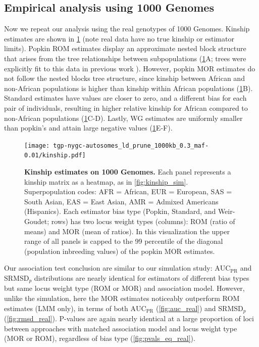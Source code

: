 \documentclass[11pt]{article}
\newcommand{\rmsd}{\text{SRMSD}_p}
\newcommand{\auc}{\text{AUC}_\text{PR}}
\begin{document}
\subsection{Empirical analysis using 1000 Genomes}

Now we repeat our analysis using the real genotypes of 1000 Genomes.
Kinship estimates are shown in \cref{fig:kinship_real} (note real data have no true kinship or estimator limits).
Popkin ROM estimates display an approximate nested block structure that arises from the tree relationships between subpopulations (\cref{fig:kinship_real}A; trees were explicitly fit to this data in previous work \citep{yao_limitations_2022}).
However, popkin MOR estimates do not follow the nested blocks tree structure, since kinship between African and non-African populations is higher than kinship within African populations (\cref{fig:kinship_real}B).
Standard estimates have values are closer to zero, and a different bias for each pair of individuals, resulting in higher relative kinship for African compared to non-African populations (\cref{fig:kinship_real}C-D).
Lastly, WG estimates are uniformly smaller than popkin's and attain large negative values (\cref{fig:kinship_real}E-F).

\begin{figure}[bp!]
  \centering
  \texttt{[image: tgp-nygc-autosomes\_ld\_prune\_1000kb\_0.3\_maf-0.01/kinship.pdf]}
  \caption{
    {\bf Kinship estimates on 1000 Genomes.}
    Each panel represents a kinship matrix as a heatmap, as in \cref{fig:kinship_sim}.
    Superpopulation codes: AFR = African, EUR = European, SAS = South Asian, EAS = East Asian, AMR = Admixed Americans (Hispanics).
    Each estimator bias type (Popkin, Standard, and Weir-Goudet; rows) has two locus weight types (columns): ROM (ratio of means) and MOR (mean of ratios).
    In this visualization the upper range of all panels is capped to the 99 percentile of the diagonal (population inbreeding values) of the popkin MOR estimates.
  }
  \label{fig:kinship_real}
\end{figure}

Our association test conclusion are similar to our simulation study: $\auc$ and $\rmsd$ distributions are nearly identical for estimators of different bias types but same locus weight type (ROM or MOR) and association model.
However, unlike the simulation, here the MOR estimates noticeably outperform ROM estimates (LMM only), in terms of both $\auc$ (\cref{fig:auc_real}) and $\rmsd$ (\cref{fig:rmsd_real}).
P-values are again nearly identical at a large proportion of loci between approaches with matched association model and locus weight type (MOR or ROM), regardless of bias type (\cref{fig:pvals_eq_real}).
\end{document}
